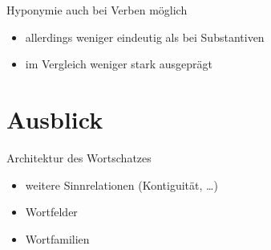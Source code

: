 \begin{frame}{Hyponymie}
\onslide<+->
auch bei Verben möglich
\Halbzeile
\begin{itemize}[<+->]
	\item		allerdings weniger eindeutig als bei Substantiven
	\item		im Vergleich weniger stark ausgeprägt
\end{itemize}
\onslide<+->
\Zeile
\begin{exe}
	\ex\label{ex:hyponymie-003}
    \begin{xlist}
		\onslide<+->
	\end{xlist}
\end{exe}
\end{frame}



\section{Ausblick}

\begin{frame}{Architektur des Wortschatzes}
\onslide<+->
\begin{itemize}[<+->]
  \item weitere Sinnrelationen (Kontiguität, \ldots)
	\item	Wortfelder
	\item	Wortfamilien
\end{itemize}
 \end{frame}
 

